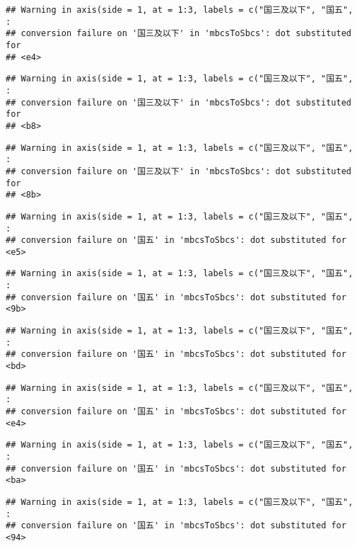 \documentclass[]{article}
\begin{document}
\begin{verbatim}
## Warning in axis(side = 1, at = 1:3, labels = c("国三及以下", "国五", :
## conversion failure on '国三及以下' in 'mbcsToSbcs': dot substituted for
## <e4>
\end{verbatim}

\begin{verbatim}
## Warning in axis(side = 1, at = 1:3, labels = c("国三及以下", "国五", :
## conversion failure on '国三及以下' in 'mbcsToSbcs': dot substituted for
## <b8>
\end{verbatim}

\begin{verbatim}
## Warning in axis(side = 1, at = 1:3, labels = c("国三及以下", "国五", :
## conversion failure on '国三及以下' in 'mbcsToSbcs': dot substituted for
## <8b>
\end{verbatim}

\begin{verbatim}
## Warning in axis(side = 1, at = 1:3, labels = c("国三及以下", "国五", :
## conversion failure on '国五' in 'mbcsToSbcs': dot substituted for <e5>
\end{verbatim}

\begin{verbatim}
## Warning in axis(side = 1, at = 1:3, labels = c("国三及以下", "国五", :
## conversion failure on '国五' in 'mbcsToSbcs': dot substituted for <9b>
\end{verbatim}

\begin{verbatim}
## Warning in axis(side = 1, at = 1:3, labels = c("国三及以下", "国五", :
## conversion failure on '国五' in 'mbcsToSbcs': dot substituted for <bd>
\end{verbatim}

\begin{verbatim}
## Warning in axis(side = 1, at = 1:3, labels = c("国三及以下", "国五", :
## conversion failure on '国五' in 'mbcsToSbcs': dot substituted for <e4>
\end{verbatim}

\begin{verbatim}
## Warning in axis(side = 1, at = 1:3, labels = c("国三及以下", "国五", :
## conversion failure on '国五' in 'mbcsToSbcs': dot substituted for <ba>
\end{verbatim}

\begin{verbatim}
## Warning in axis(side = 1, at = 1:3, labels = c("国三及以下", "国五", :
## conversion failure on '国五' in 'mbcsToSbcs': dot substituted for <94>
\end{verbatim}
\end{document}
